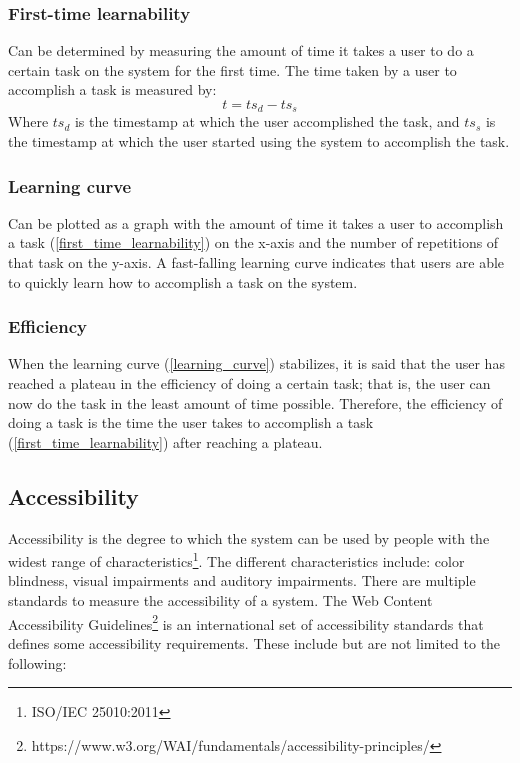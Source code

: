 \documentclass[11pt,a4paper]{article}
\def \iso{\footnote{ISO/IEC 25010:2011}}
\begin{document}
\subsubsection{\label{first_time_learnability}First-time learnability}
Can be determined by measuring the amount of time it takes a user to do a certain task on the system for the first time.
The time taken by a user to accomplish a task is measured by:
\[t = ts_d - ts_s\]
Where $ts_d$ is the timestamp at which the user accomplished the task,
and $ts_s$ is the timestamp at which the user started using the system to accomplish the task.

\subsubsection{\label{learning_curve}Learning curve}
Can be plotted as a graph with the amount of time it takes a user to accomplish a
task (\ref{first_time_learnability}) on the x-axis and the number of repetitions of that task on the y-axis.
A fast-falling learning curve indicates that users are able to quickly learn how to accomplish a task on the system.

\subsubsection{Efficiency}
When the learning curve (\ref{learning_curve}) stabilizes,
it is said that the user has reached a plateau in the efficiency of doing a certain task;
that is, the user can now do the task in the least amount of time possible.
Therefore, the efficiency of doing a task is the time the user takes to accomplish a task (\ref{first_time_learnability})
after reaching a plateau.

\subsection{Accessibility}
Accessibility is the degree to which the system can be used by people with the widest range of characteristics\iso.
The different characteristics include: color blindness, visual impairments and auditory impairments.
There are multiple standards to measure the accessibility of a system.
The Web Content Accessibility Guidelines\footnote{https://www.w3.org/WAI/fundamentals/accessibility-principles/}
is an international set of accessibility standards that defines some accessibility requirements.
These include but are not limited to the following:
\end{document}
